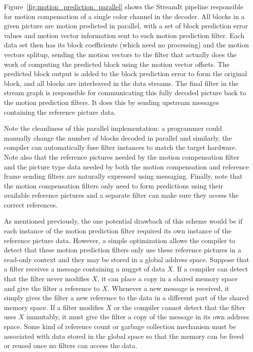 Figure~\ref{fig:motion_prediction_parallel} shows the StreamIt pipeline responsible for 
motion compensation of a single color channel in the decoder. All blocks in a given 
picture are motion predicted in parallel, with a set of block prediction error values 
and motion vector information sent to each motion prediction filter. Each data set then 
has its block coefficients (which need no processing) and the motion vectors splitup, 
sending the motion vectors to the filter that actually does the work of computing the 
predicted block using the motion vector offsets. The predicted block output is added 
to the block prediction error to form the original block, and all blocks are 
interleaved in the data streams. The final filter in the stream graph is responsible for 
communicating this fully decoded picture back to the motion prediction filters. It 
does this by sending upstream messages containing the reference picture data.

Note the cleanliness of this parallel implementation: 
a programmer could manually change the number of blocks 
decoded in parallel and similarly, the compiler can 
automatically fuse filter instances to match the target 
hardware. 
Note also that the reference pictures needed 
by the motion compensation filter and the picture type 
data needed by both the motion compensation and 
reference frame sending filters are naturally expressed using 
messaging. Finally, note that the motion compensation filters
only need to form predictions using their available reference
pictures and a separate filter can make sure they access
the correct references.

As mentioned previously, the one potential drawback of this
scheme would be if each instance of the motion prediction 
filter required its own instance of the reference picture 
data. However, a simple optimization allows the compiler to 
detect that these motion prediction filters only use these 
reference pictures in a read-only context and they may be 
stored in a global address space. Suppose that a filter 
receives a message containing a nugget of data $X$. If a 
compiler can detect that the filter never modifies $X$, 
it can place a copy in a shared memory space and give the 
filter a reference to $X$. Whenever a new message is 
received, it simply gives the filter a new reference to the 
data in a different part of the shared memory space. If 
a filter modifies $X$ or the compiler cannot detect 
that the filter uses $X$ immutably, it must give the 
filter a copy of the message in its own address space. Some 
kind of reference count or garbage collection mechanism 
must be associated with data stored in the global space 
so that the memory can be freed or reused once no filters 
can access the data.

